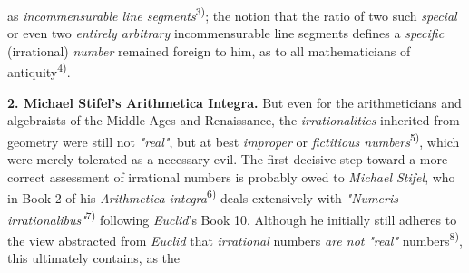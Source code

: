 \thispagestyle{fancy}

\vspace{0.5cm}

as \textit{incommensurable line segments}\textsuperscript{3)}; the notion that the ratio of two such \textit{special} or even two \textit{entirely arbitrary} incommensurable line segments defines a \textit{specific} (irrational) \textit{number} remained foreign to him, as to all mathematicians of antiquity\textsuperscript{4)}.

\vspace{0.5cm}

\textbf{2. Michael Stifel's Arithmetica Integra.} But even for the arithmeticians and algebraists of the Middle Ages and Renaissance, the \textit{irrationalities} inherited from geometry were still not \textit{"real"}, but at best \textit{improper} or \textit{fictitious numbers}\textsuperscript{5)}, which were merely tolerated as a necessary evil. The first decisive step toward a more correct assessment of irrational numbers is probably owed to \textit{Michael Stifel}, who in Book 2 of his \textit{Arithmetica integra}\textsuperscript{6)} deals extensively with \textit{"Numeris irrationalibus"}\textsuperscript{7)} following \textit{Euclid}'s Book 10. Although he initially still adheres to the view abstracted from \textit{Euclid} that \textit{irrational} numbers \textit{are not} \textit{"real"} numbers\textsuperscript{8)}, this ultimately contains, as the

